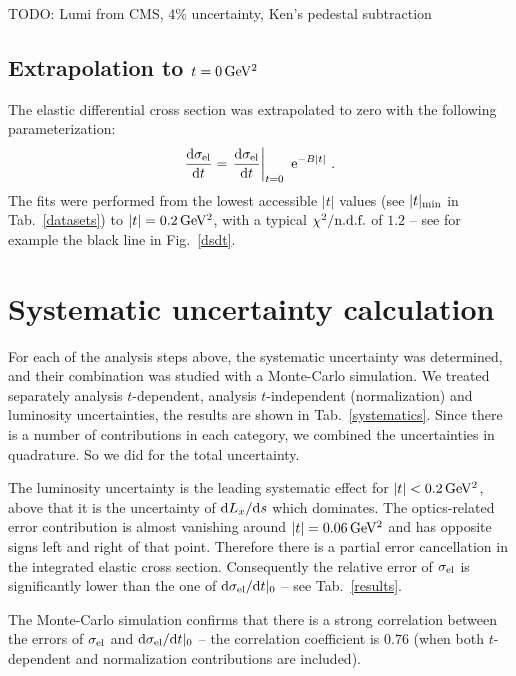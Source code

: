 \documentclass[doublecol]{../macros/epl2}
\def\d{{\rm d}}
\def\un#1{\,{\rm #1}}
\def\e{{\rm e}}
\begin{document}
TODO: Lumi from CMS, 4\% uncertainty, Ken's pedestal subtraction

\subsection{Extrapolation to $t=0\,\rm GeV^2$}

The elastic differential cross section was extrapolated to zero with the following parameterization:
\begin{equation}
\label{extrapolation}
{\d\sigma_{\rm el}\over \d t} = \left. {\d\sigma_{\rm el}\over \d t}\right|_{t=0} \ \e^{-B|t|}\ .
\end{equation}
The fits were performed from the lowest accessible $|t|$ values (see $|t|_{\rm min}$ in Tab.~\ref{datasets}) to $|t| = 0.2\un{GeV^2}$, with a typical $\chi^2/\hbox{n.d.f.}$ of $1.2$ -- see for example the black line in Fig.~\ref{dsdt}.

\section{Systematic uncertainty calculation}


For each of the analysis steps above, the systematic uncertainty was determined, and their combination was studied with a Monte-Carlo simulation. We treated separately analysis $t$-dependent, analysis $t$-independent (normalization) and luminosity uncertainties, the results are shown in Tab.~\ref{systematics}. Since there is a number of contributions in each category, we combined the uncertainties in quadrature. So we did for the total uncertainty.

The luminosity uncertainty is the leading systematic effect for $|t| < 0.2\un{GeV^2}$, above that it is the uncertainty of $\d L_x/\d s$ which dominates. The optics-related error contribution is almost vanishing around $|t| = 0.06\un{GeV^2}$ and has opposite signs left and right of that point. Therefore there is a partial error cancellation in the integrated elastic cross section. Consequently the relative error of $\sigma_{\rm el}$ is significantly lower than the one of $\d\sigma_{\rm el}/\d t|_0$ -- see Tab.~\ref{results}.

The Monte-Carlo simulation confirms that there is a strong correlation between the errors of $\sigma_{\rm el}$ and $\d\sigma_{\rm el}/\d t|_0$ -- the correlation coefficient is $0.76$ (when both $t$-dependent and normalization contributions are included).
\end{document}

